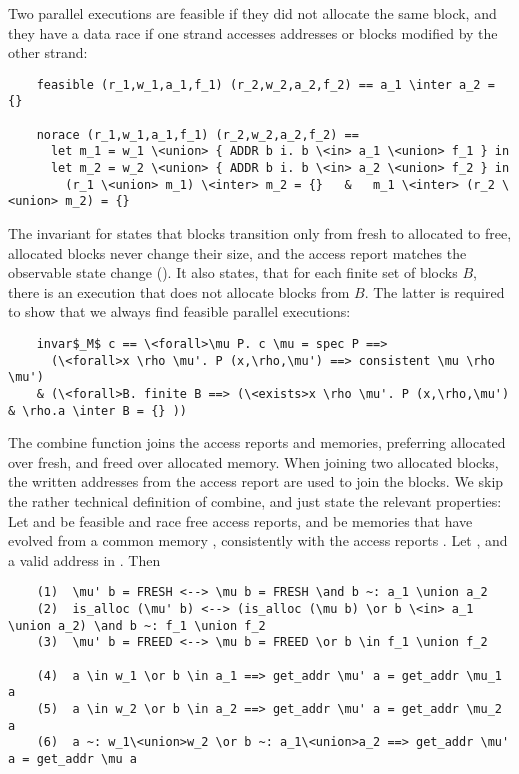 \documentclass[a4paper,UKenglish,cleveref, autoref, thm-restate]{lipics-v2021}
\begin{document}
  Two parallel executions are feasible if they did not allocate the same block, and they have a data race
  if one strand accesses addresses or blocks modified by the other strand:
  \begin{lstlisting}
    feasible (r_1,w_1,a_1,f_1) (r_2,w_2,a_2,f_2) == a_1 \inter a_2 = {}

    norace (r_1,w_1,a_1,f_1) (r_2,w_2,a_2,f_2) ==
      let m_1 = w_1 \<union> { ADDR b i. b \<in> a_1 \<union> f_1 } in
      let m_2 = w_2 \<union> { ADDR b i. b \<in> a_2 \<union> f_2 } in
        (r_1 \<union> m_1) \<inter> m_2 = {}   &   m_1 \<inter> (r_2 \<union> m_2) = {}
  \end{lstlisting}
  The invariant for  states that blocks transition only from fresh to allocated to free,
  allocated blocks never change their size, and the access report matches the observable state change ().
  It also states, that for each finite set of blocks $B$, there is an execution that does not allocate blocks from $B$.
  The latter is required to show that we always find feasible parallel executions:
  \begin{lstlisting}
    invar$_M$ c == \<forall>\mu P. c \mu = spec P ==>
      (\<forall>x \rho \mu'. P (x,\rho,\mu') ==> consistent \mu \rho \mu')
    & (\<forall>B. finite B ==> (\<exists>x \rho \mu'. P (x,\rho,\mu') & \rho.a \inter B = {} ))
  \end{lstlisting}
  The combine function joins the access reports and memories,
  preferring allocated over fresh, and freed over allocated memory. When joining two allocated blocks, the written addresses
  from the access report are used to join the blocks. We skip the rather technical definition of combine, and just state the
  relevant properties: Let  and  be feasible and race free access reports,
  and  be memories that have evolved from a common memory \is{\mu}, consistently with
  the access reports . Let , and  a valid address in . Then
  \begin{lstlisting}
    (1)  \mu' b = FRESH <--> \mu b = FRESH \and b ~: a_1 \union a_2
    (2)  is_alloc (\mu' b) <--> (is_alloc (\mu b) \or b \<in> a_1 \union a_2) \and b ~: f_1 \union f_2
    (3)  \mu' b = FREED <--> \mu b = FREED \or b \in f_1 \union f_2

    (4)  a \in w_1 \or b \in a_1 ==> get_addr \mu' a = get_addr \mu_1 a
    (5)  a \in w_2 \or b \in a_2 ==> get_addr \mu' a = get_addr \mu_2 a
    (6)  a ~: w_1\<union>w_2 \or b ~: a_1\<union>a_2 ==> get_addr \mu' a = get_addr \mu a
  \end{lstlisting}
\end{document}
